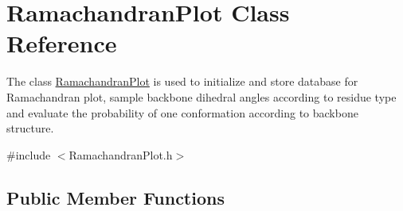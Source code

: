 \hypertarget{classRamachandranPlot}{\section{Ramachandran\-Plot Class Reference}
\label{classRamachandranPlot}
}


The class \hyperlink{classRamachandranPlot}{Ramachandran\-Plot} is used to initialize and store database for Ramachandran plot, sample backbone dihedral angles according to residue type and evaluate the probability of one conformation according to backbone structure.  




{\ttfamily \#include $<$Ramachandran\-Plot.\-h$>$}

\subsection*{Public Member Functions}
